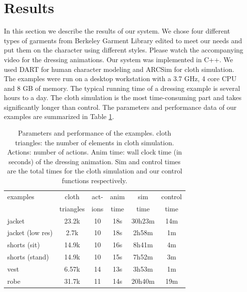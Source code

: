 \section{Results}


In this section we describe the results of our system. We chose four different types of garments from Berkeley Garment Library edited to meet our needs and put them on the character using different styles. Please watch the accompanying video for the dressing animations. Our system was implemented in C++. We used DART \cite{Liu:2012:STM} for human character modeling and ARCSim \cite{Narain:2012:AAR} for cloth simulation. The examples were run on a desktop workstation with a 3.7 GHz, 4 core CPU and 8 GB of memory. The typical running time of a dressing example is several hours to a day. The cloth simulation is the most time-consuming part and takes significantly longer than control. The parameters and performance data of our examples are summarized in Table
 \ref{table:data}. 

\begin{table}[h]
  \centering
  \begin{tabular}{|l|c|c|c|c|c|}
    \hline
    examples 		& cloth 	& act- 	& anim	& sim 		& control \\
                    & triangles & 	ions& time 	& time 		& time \\
    \hline
    jacket 			& 23.2k  	& 10	& 18s 	& 30h23m	&  14m  \\
    jacket (low res)& 2.7k		& 10	& 18s	& 2h58m		& 1m \\
    shorts (sit) 	& 14.9k 	& 10	& 16s 	&  8h41m 	& 4m \\
    shorts (stand)	& 14.9k 	& 10	& 15s	&  7h52m	& 3m \\
    vest 			& 6.57k		& 14	& 13s	&  3h53m	& 1m   \\
    robe 			& 31.7k 	& 11	& 14s	& 20h40m	& 19m  \\
    \hline
  \end{tabular}
  \caption{Parameters and performance of the examples. cloth triangles: the number of elements in cloth simulation. Actions: number of actions. Anim time: wall clock time (in seconds) of the dressing animation. Sim and control times are the total times for the cloth simulation and our control functions respectively.}
  \label{table:data}
\end{table}


